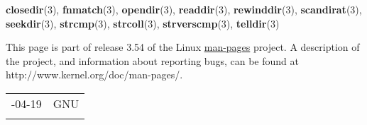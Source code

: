 \documentclass[]{article}
\let\realtextbf=\textbf
\renewcommand{\textbf}[1]{\textcolor{boldcolor}{\realtextbf{#1}}}
\renewcommand{\emph}[1]{\underline{#1}}
\begin{document}

\textbf{closedir}(3), \textbf{fnmatch}(3), \textbf{opendir}(3),
\textbf{readdir}(3), \textbf{rewinddir}(3), \textbf{scandirat}(3),
\textbf{seekdir}(3), \textbf{strcmp}(3), \textbf{strcoll}(3),
\textbf{strverscmp}(3), \textbf{telldir}(3)


This page is part of release 3.54 of the Linux \emph{man-pages} project.
A description of the project, and information about reporting bugs, can
be found at http://www.kernel.org/doc/man-pages/.

\begin{longtable}[c]{@{}ll@{}}
\toprule\addlinespace
2013-04-19 & GNU
\\\addlinespace
\bottomrule
\end{longtable}
\end{document}
